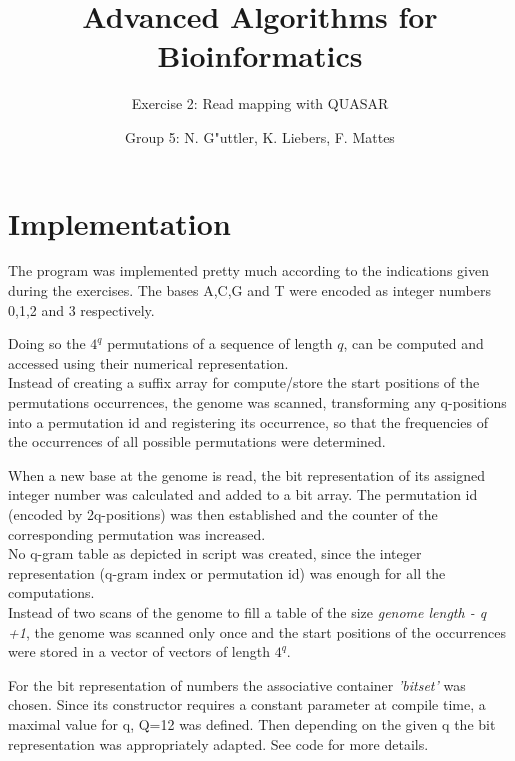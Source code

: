 \documentclass[11pt, notitlepage]{scrartcl}
\begin{document}
         


\title{Advanced Algorithms for Bioinformatics} 
\subtitle{Exercise 2: Read mapping with QUASAR}
\author{Group 5: N. G"uttler, K. Liebers, F. Mattes} %
\maketitle

\section{Implementation}
The program was implemented pretty much according to the indications given during the exercises. The bases A,C,G and T were encoded as integer numbers 0,1,2 and 3 respectively.

Doing so the $4^q$ permutations of a sequence of length $q$, can be computed and accessed using their numerical representation.\\ 
Instead of creating a suffix array for compute/store the start positions of the permutations occurrences, the genome was scanned, transforming any q-positions into a permutation id and registering its occurrence, so that the frequencies of the occurrences of all possible permutations were determined.

When a new base at the genome is read, the bit representation of  its assigned integer number was calculated and added to a bit array. The permutation id (encoded by 2q-positions) was then established and the counter of the corresponding permutation was increased. \\
No q-gram table as depicted in script was created, since the integer representation (q-gram index or permutation id) was enough for all the computations.\\ 
Instead of two scans of the genome to fill a table of the size \textit{genome length - q +1}, the genome was scanned only once and the start positions of the occurrences were stored in a vector of vectors of length $4^q$.

For the bit representation of numbers the associative container \textit{'bitset'} was chosen. Since its constructor requires a constant parameter at compile time, a maximal value for q, Q=12 was defined. Then depending on the given q the bit representation was appropriately adapted. 
See code for more details.   
\end{document}
